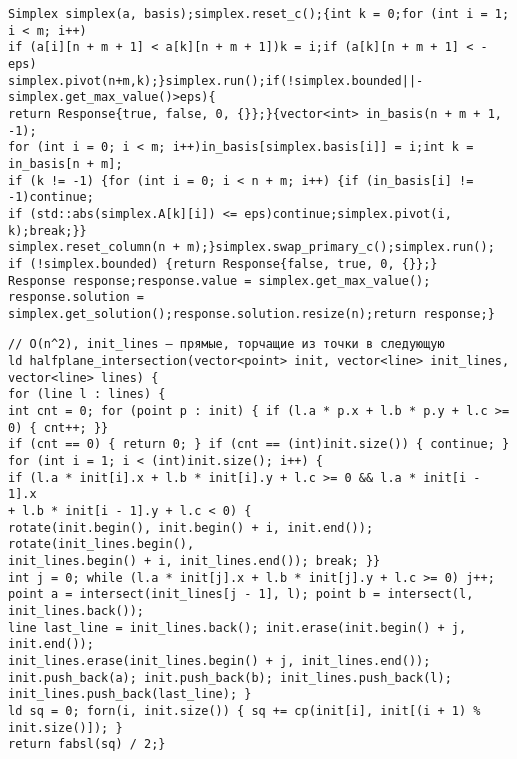 \documentclass[a4paper,12pt]{article}
\begin{document}
\begin{verbatim}
Simplex simplex(a, basis);simplex.reset_c();{int k = 0;for (int i = 1; i < m; i++)
if (a[i][n + m + 1] < a[k][n + m + 1])k = i;if (a[k][n + m + 1] < -eps)
simplex.pivot(n+m,k);}simplex.run();if(!simplex.bounded||-simplex.get_max_value()>eps){
return Response{true, false, 0, {}};}{vector<int> in_basis(n + m + 1, -1);
for (int i = 0; i < m; i++)in_basis[simplex.basis[i]] = i;int k = in_basis[n + m];
if (k != -1) {for (int i = 0; i < n + m; i++) {if (in_basis[i] != -1)continue;
if (std::abs(simplex.A[k][i]) <= eps)continue;simplex.pivot(i, k);break;}}
simplex.reset_column(n + m);}simplex.swap_primary_c();simplex.run();
if (!simplex.bounded) {return Response{false, true, 0, {}};}
Response response;response.value = simplex.get_max_value();
response.solution = simplex.get_solution();response.solution.resize(n);return response;}
\end{verbatim}

\begin{verbatim}
// O(n^2), init_lines — прямые, торчащие из точки в следующую
ld halfplane_intersection(vector<point> init, vector<line> init_lines, vector<line> lines) {
for (line l : lines) {
int cnt = 0; for (point p : init) { if (l.a * p.x + l.b * p.y + l.c >= 0) { cnt++; }}
if (cnt == 0) { return 0; } if (cnt == (int)init.size()) { continue; }
for (int i = 1; i < (int)init.size(); i++) {
if (l.a * init[i].x + l.b * init[i].y + l.c >= 0 && l.a * init[i - 1].x
+ l.b * init[i - 1].y + l.c < 0) {
rotate(init.begin(), init.begin() + i, init.end()); rotate(init_lines.begin(), 
init_lines.begin() + i, init_lines.end()); break; }}
int j = 0; while (l.a * init[j].x + l.b * init[j].y + l.c >= 0) j++;
point a = intersect(init_lines[j - 1], l); point b = intersect(l, init_lines.back());
line last_line = init_lines.back(); init.erase(init.begin() + j, init.end());
init_lines.erase(init_lines.begin() + j, init_lines.end());
init.push_back(a); init.push_back(b); init_lines.push_back(l);
init_lines.push_back(last_line); }
ld sq = 0; forn(i, init.size()) { sq += cp(init[i], init[(i + 1) % init.size()]); }
return fabsl(sq) / 2;}
\end{verbatim}


\end{document}
